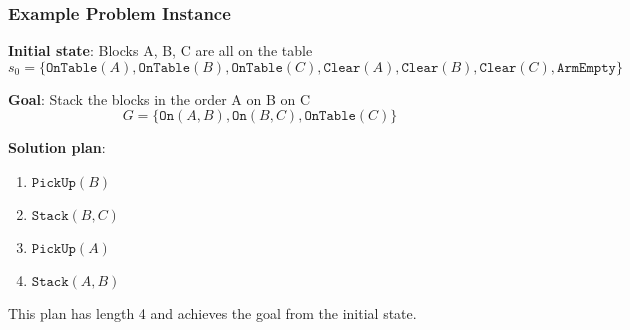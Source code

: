 \documentclass[11pt,a4paper]{article}
\theoremstyle{definition}
\theoremstyle{plain}
\theoremstyle{remark}
\begin{document}
\subsubsection{Example Problem Instance}

\textbf{Initial state}: Blocks A, B, C are all on the table
\[
s_0 = \{\texttt{OnTable}(A), \texttt{OnTable}(B), \texttt{OnTable}(C), \texttt{Clear}(A), \texttt{Clear}(B), \texttt{Clear}(C), \texttt{ArmEmpty}\}
\]

\textbf{Goal}: Stack the blocks in the order A on B on C
\[
G = \{\texttt{On}(A, B), \texttt{On}(B, C), \texttt{OnTable}(C)\}
\]

\textbf{Solution plan}:
\begin{enumerate}
    \item $\texttt{PickUp}(B)$
    \item $\texttt{Stack}(B, C)$
    \item $\texttt{PickUp}(A)$
    \item $\texttt{Stack}(A, B)$
\end{enumerate}

This plan has length 4 and achieves the goal from the initial state.
\end{document}
